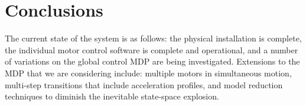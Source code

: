 \section{Conclusions}
\label{sec:conclude}

The current state of the system is as follows:
the physical installation is complete,
the individual motor control software is complete and operational,
and a number of variations on the global control MDP are being investigated.
Extensions to the MDP that we are
considering include: multiple motors in simultaneous motion, multi-step
transitions that include acceleration profiles, and model reduction
techniques to diminish the inevitable state-space explosion.
